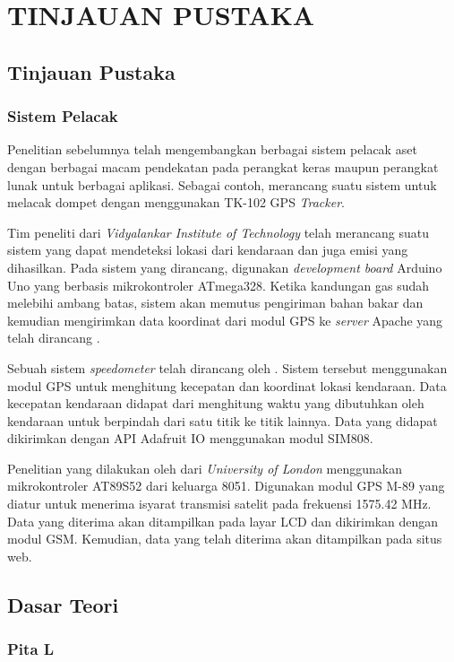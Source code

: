 \chapter{TINJAUAN PUSTAKA}

\section{Tinjauan Pustaka}
\label{sec: Tinjauan_Pustaka}
\subsection{Sistem Pelacak}
Penelitian sebelumnya telah mengembangkan berbagai sistem pelacak aset dengan berbagai macam pendekatan pada perangkat keras maupun perangkat lunak untuk berbagai aplikasi. Sebagai contoh, \cite{Ekhsan2022} merancang suatu sistem untuk melacak dompet dengan menggunakan TK-102 GPS \textit{Tracker}.

Tim peneliti dari \textit{Vidyalankar Institute of Technology} telah merancang suatu sistem yang dapat mendeteksi lokasi dari kendaraan dan juga emisi  yang dihasilkan. Pada sistem yang dirancang, digunakan \textit{development board} Arduino Uno yang berbasis mikrokontroler ATmega328. Ketika kandungan gas  sudah melebihi ambang batas, sistem akan memutus pengiriman bahan bakar dan kemudian mengirimkan data koordinat dari modul GPS ke \textit{server} Apache yang telah dirancang \cite{Asha2022}.

Sebuah sistem \textit{speedometer} telah dirancang oleh \cite{Najmurrokhman2021}. Sistem tersebut menggunakan modul GPS untuk menghitung kecepatan dan koordinat lokasi kendaraan. Data kecepatan kendaraan didapat dari menghitung waktu yang dibutuhkan oleh kendaraan untuk berpindah dari satu titik ke titik lainnya. Data yang didapat dikirimkan dengan API Adafruit IO menggunakan modul SIM808.

Penelitian yang dilakukan oleh \cite{Mukhtar2015} dari \textit{University of London} menggunakan mikrokontroler AT89S52 dari keluarga 8051. Digunakan modul GPS M-89 yang diatur untuk menerima isyarat transmisi satelit pada frekuensi 1575.42 MHz. Data yang diterima akan ditampilkan pada layar LCD dan dikirimkan dengan modul GSM. Kemudian, data yang telah diterima akan ditampilkan pada situs web.

\section{Dasar Teori}
\subsection{Pita L}

